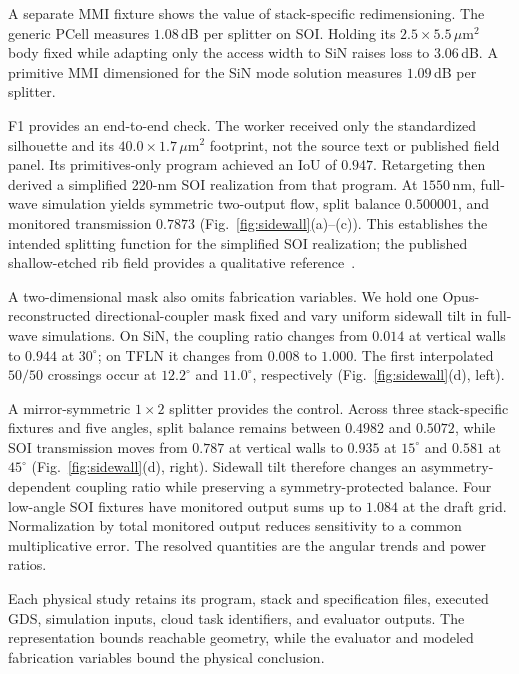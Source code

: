 \documentclass[%
 reprint,
 superscriptaddress,
 amsmath,amssymb,
 aps,
 pra,
 longbibliography,
 floatfix,
]{revtex4-2}
\begin{document}
A separate MMI fixture shows the value of stack-specific redimensioning.
The generic PCell measures $1.08$\,dB per splitter on SOI. Holding its
$2.5\times5.5\,\mu\mathrm{m}^{2}$ body fixed while adapting only the access
width to SiN raises loss to $3.06$\,dB. A primitive MMI dimensioned for the
SiN mode solution measures $1.09$\,dB per splitter.

F1 provides an end-to-end check. The worker received only the standardized
silhouette and its $40.0\times1.7\,\mu\mathrm{m}^{2}$ footprint, not the source
text or published field panel. Its primitives-only program achieved
an IoU of $0.947$. Retargeting then derived a simplified 220-nm SOI realization
from that program. At $1550$\,nm, full-wave simulation yields symmetric
two-output flow, split balance $0.500001$, and monitored transmission
$0.7873$ (Fig.~\ref{fig:sidewall}(a)--(c)). This establishes the intended
splitting function for the simplified SOI realization; the published
shallow-etched rib field provides a qualitative reference~\cite{splitter2020}.

A two-dimensional mask also omits fabrication variables. We hold one
Opus-reconstructed directional-coupler mask fixed and vary uniform sidewall
tilt in full-wave simulations. On SiN, the coupling ratio changes from
$0.014$ at vertical walls to $0.944$ at $30^{\circ}$; on TFLN it changes
from $0.008$ to $1.000$. The first interpolated $50/50$ crossings occur at
$12.2^{\circ}$ and $11.0^{\circ}$, respectively
(Fig.~\ref{fig:sidewall}(d), left).

A mirror-symmetric $1{\times}2$ splitter provides the control. Across three
stack-specific fixtures and five angles, split balance remains between
$0.4982$ and $0.5072$, while SOI transmission moves from $0.787$ at
vertical walls to $0.935$ at $15^{\circ}$ and $0.581$ at $45^{\circ}$
(Fig.~\ref{fig:sidewall}(d), right). Sidewall tilt therefore changes an
asymmetry-dependent coupling ratio while preserving a symmetry-protected
balance. Four low-angle SOI fixtures have monitored output sums up to
$1.084$ at the draft grid. Normalization by total monitored output reduces
sensitivity to a common multiplicative error. The resolved quantities are
the angular trends and power ratios.

Each physical study retains its program, stack and specification files,
executed GDS, simulation inputs, cloud task identifiers, and evaluator
outputs. The representation bounds reachable geometry, while the evaluator
and modeled fabrication variables bound the physical conclusion.
\end{document}
